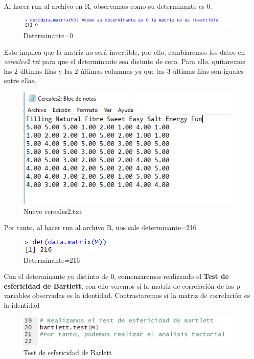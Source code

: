\documentclass[12pt,a4paper]{book}
\begin{document}
Al hacer run al archivo en R, observamos como su determinante es 0.
\begin{figure}[H]
\centering
\includegraphics[scale=0.8]{Captura4.png} 
\caption{Determinante=0}
\label{fig:Det0}
\end{figure}
Esto implica que la matriz no será invertible, por ello, cambiaremos los datos en \textit{cereales2.txt} para que el determinante sea distinto de cero. Para ello, quitaremos las 2 últimas filas y las 2 últimas columnas ya que las 3 últimas filas son iguales entre ellas. 
\begin{figure}[H]
\centering
\includegraphics[scale=1]{Captura5.png} 
\caption{Nuevo cereales2.txt}
\label{fig:c2new}
\end{figure}
Por tanto, al hacer run al archivo R, nos sale determinante=216
\begin{figure}[H]
\centering
\includegraphics[scale=1]{Captura6.png} 
\caption{Determinante=216}
\label{fig:det216}
\end{figure}
Con el determinante ya distinto de 0, comenzaremos realizando el \textbf{Test de esfericidad de Bartlett}, con ello veremos si la matriz de correlación de las p variables observadas es la identidad. Contrastaremos si la matriz de correlación es la identidad
\begin{figure}[H]
\centering
\includegraphics[scale=1]{Captura7.png} 
\caption{Test de esfericidad de Barlett}
\label{fig:bar}
\end{figure}
\end{document}
